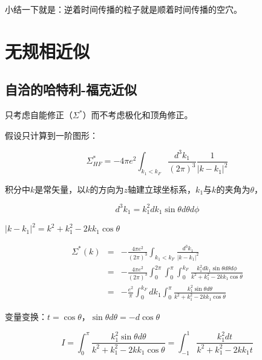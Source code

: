 小结一下就是：逆着时间传播的粒子就是顺着时间传播的空穴。



\section{无规相近似}

\subsection{自洽的哈特利-福克近似}

只考虑自能修正（$\Sigma^*$）而不考虑极化和顶角修正。

假设只计算到一阶图形：

\begin{equation}
\Sigma^*_{HF} = - 4 \pi e^2 \int_{k_1 < k_F} \frac{d^3 k_1 }{(2 \pi)^3 } \frac{1}{\left| k - k_1  \right|^2 }
\end{equation}

积分中$k$是常矢量，以$k$的方向为$z$轴建立球坐标系，$k_1$与$k$的夹角为$\theta$，

\begin{equation*}
d^3 k_1 = k_1^2 d k_1 \sin \theta d \theta d \phi
\end{equation*}

$\left|  k - k_1 \right|^2 = k^2 + k_1^2 - 2 k k_1 \cos \theta  $

\begin{eqnarray*}
\Sigma^*(k) & = & - \frac{4 \pi e^2 }{(2 \pi)^3 } \int_{k_1 < k_F} \frac{d^3 k_1}{ \left| k - k_1  \right|^2 }   \\
{}& = & - \frac{4 \pi e^2 }{(2 \pi)^3 } \int_0^{2 \pi}  \int_0^{\pi}  \int_0^{k_F} \frac{k_1^2 d k_1 \sin \theta d \theta d \phi }{ k^2 + k_1^2 - 2 k k_1 \cos \theta  } \\
{} &=& - \frac{e^2}{\pi} \int_0^{k_F} d k_1 \int_0^{\pi} \frac{k_1^2 \sin \theta d \theta }{k^2 + k_1^2 -2 k k_1 \cos \theta}
\end{eqnarray*}

变量变换：$t = \cos \theta$，$\sin \theta d \theta = - d \cos \theta$

\begin{equation*}
I = \int_0^{\pi} \frac{ k_1^2 \sin \theta d \theta  }{ k^2 + k_1^2 - 2 k k_1 \cos \theta } = \int_{-1}^{1}  \frac{k_1^2 d t }{ k^2 + k_1^2 - 2 k k_1 t  } 
\end{equation*}

